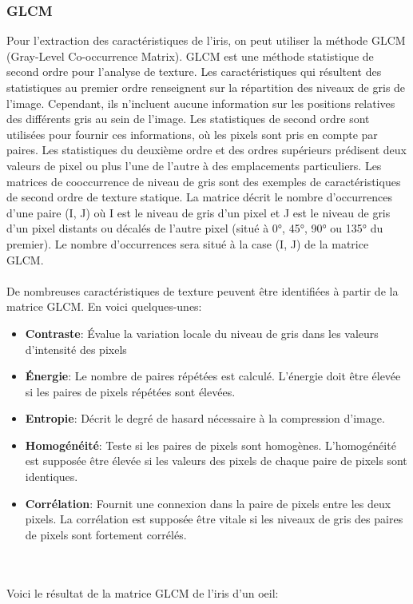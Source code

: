 \documentclass[12pt,twoside,letterpaper]{article}
\begin{document}
\subsubsection{GLCM}
Pour l’extraction des caractéristiques de l’iris, on peut utiliser la méthode GLCM (Gray-Level Co-occurrence Matrix). GLCM est une méthode statistique de second ordre pour l'analyse de texture. Les caractéristiques qui résultent des statistiques au premier ordre renseignent sur la répartition des niveaux de gris de l'image. Cependant, ils n'incluent aucune information sur les positions relatives des différents gris au sein de l'image. Les statistiques de second ordre sont utilisées pour fournir ces informations, où les pixels sont pris en compte par paires. Les statistiques du deuxième ordre et des ordres supérieurs prédisent deux valeurs de pixel ou plus l'une de l'autre à des emplacements particuliers. Les matrices de cooccurrence de niveau de gris sont des exemples de caractéristiques de second ordre de texture statique. La matrice décrit le nombre d’occurrences d’une paire (I, J) où I est le niveau de gris d’un pixel et J est le niveau de gris d’un pixel distants ou décalés de l’autre pixel (situé à 0°, 45°, 90° ou 135° du premier). Le nombre d’occurrences sera situé à la case (I, J) de la matrice GLCM.
\\~\\
De nombreuses caractéristiques de texture peuvent être identifiées à partir de la matrice GLCM. En voici quelques-unes:
\begin{itemize}
    \item \textbf{Contraste}: Évalue la variation locale du niveau de gris dans les valeurs d'intensité des pixels
    \item \textbf{Énergie}: Le nombre de paires répétées est calculé. L'énergie doit être élevée si les paires de pixels répétées sont élevées.
    \item \textbf{Entropie}: Décrit le degré de hasard nécessaire à la compression d'image.
    \item \textbf{Homogénéité}: Teste si les paires de pixels sont homogènes. L'homogénéité est supposée être élevée si les valeurs des pixels de chaque paire de pixels sont identiques.
    \item \textbf{Corrélation}: Fournit une connexion dans la paire de pixels entre les deux pixels. La corrélation est supposée être vitale si les niveaux de gris des paires de pixels sont fortement corrélés.
\end{itemize}
\citep{ref_02}
\\~\\
Voici le résultat de la matrice GLCM de l'iris d'un oeil:
\end{document}
